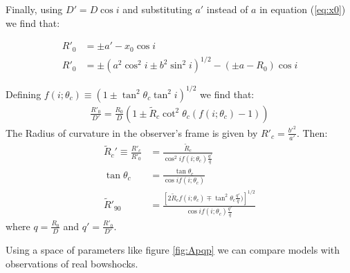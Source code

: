 Finally, using $D' = D\cos i$ and substituting $a'$ instead of $a$ in equation (\ref{eq:x0}) we find that: 

\begin{align}
R'_0 &= \pm a' - x_0\cos i \\
R'_0 &= \pm\left(a^2\cos^2 i \pm b^2\sin^2 i\right)^{1/2}  - (\pm a-R_0)\cos i
\end{align}

Defining  $f(i;\theta_c)\equiv\left(1\pm\tan^2\theta_c\tan^2i\right)^{1/2}$ we find that:
\begin{align}
\frac{R'_0}{D'}=\frac{R_0}{D}\left(1\pm \tilde{R}_c\cot^2\theta_c(f(i;\theta_c)-1) \right)
\label{eq:qprime}
\end{align}
The Radius of curvature in the observer's frame is given by $R'_c=\frac{b'^2}{a'}$. Then:
\begin{align}
  \tilde{R}_c'\equiv  \frac{R'_c}{R'_0} &= \frac{\tilde{R}_c}{\cos^2 i f(i;\theta_c)\frac{q'}{q}}
  \label{eq:Aprime}\\
  \tan\theta_c & = \frac{\tan\theta_c}{\cos i f(i;\theta_c)} \\
  \tilde{R}'_{90} &= \frac{\left[2\tilde{R}_cf(i;\theta_c) \mp \tan^2\theta_c\frac{q'}{q})\right]^{1/2}}{\cos i f(i;\theta_c)\frac{q'}{q}}
\end{align}
where $q=\frac{R_0}{D}$ and $q' = \frac{R'_0}{D'}$.



Using a space of parameters like figure \ref{fig:Apqp} we can compare models with observations of real bowshocks.


 


